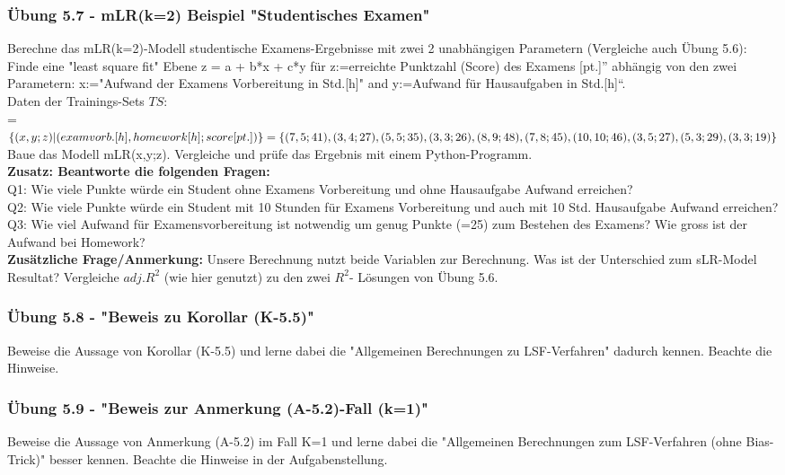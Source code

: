 \documentclass[12pt]{article}
\begin{document}
\subsubsection{Übung 5.7 - mLR(k=2) Beispiel "Studentisches Examen"}
%
Berechne das  mLR(k=2)-Modell studentische Examens-Ergebnisse mit zwei 2 unabhängigen Parametern (Vergleiche auch Übung 5.6):\\  
Finde eine "least square fit" Ebene  z = a + b*x + c*y für z:=erreichte Punktzahl (Score) des Examens [pt.]” abhängig von den zwei Parametern: x:="Aufwand der Examens Vorbereitung in Std.[h]" and y:=Aufwand für Hausaufgaben in Std.[h]“.\\[0.2cm]
Daten der Trainings-Sets $TS$: \\
= $ \lbrace (x, y; z) | (exam vorb.[h], homework[h]; score[pt.])\rbrace = \lbrace(7,5;41 ),(3,4;27), \\
(5,5;35), (3,3;26), (8,9;48), (7,8;45), (10,10;46), (3,5;27), (5,3;29), (3,3;19)\rbrace $ \\[0.2cm]
Baue das Modell mLR(x,y;z). Vergleiche und prüfe das Ergebnis mit einem Python-Programm.\\[0.2cm]
\textbf{Zusatz: Beantworte die folgenden Fragen:}\\ 
Q1: Wie viele Punkte würde ein Student ohne Examens Vorbereitung und ohne Hausaufgabe Aufwand erreichen? \\
Q2: Wie viele Punkte würde ein Student mit 10 Stunden für Examens Vorbereitung und auch mit 10 Std. Hausaufgabe Aufwand erreichen? \\ 
Q3: Wie viel Aufwand für Examensvorbereitung ist notwendig um genug Punkte (=25) zum Bestehen des Examens? Wie gross ist der Aufwand bei Homework?\\[0.2cm]
\textbf{Zusätzliche Frage/Anmerkung:} Unsere Berechnung nutzt beide Variablen zur Berechnung. Was ist der Unterschied zum sLR-Model Resultat? Vergleiche $adj.R^2$ (wie hier genutzt) zu den zwei $R^2$- Lösungen von Übung 5.6.\\
%
\subsubsection{Übung 5.8 - "Beweis zu Korollar (K-5.5)"}
%
Beweise die Aussage von Korollar (K-5.5) und lerne dabei die "Allgemeinen Berechnungen zu LSF-Verfahren" dadurch kennen. Beachte die Hinweise. 
%
\subsubsection{Übung 5.9 - "Beweis zur Anmerkung (A-5.2)-Fall (k=1)"}
%
Beweise die Aussage von Anmerkung (A-5.2) im Fall K=1 und lerne dabei die "Allgemeinen Berechnungen zum LSF-Verfahren (ohne Bias-Trick)" besser kennen. Beachte die Hinweise in der Aufgabenstellung. 
%
\end{document}
